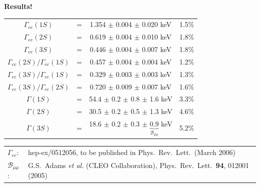 \documentclass[landscape]{article}
\newenvironment{slide}[1][ ]{\mbox{\bf #1 } \vfill}{\vfill \mbox{ } \hfill \Large \arabic{page} \pagebreak}
\newcommand{\subs}[1]{{\mbox{\large #1}}}
\newcommand{\gee}{{\boldmath $\Gamma_{ee}$}}
\newcommand{\bmm}{${\mathcal B}_{\mu\mu}$}
\begin{document}
\begin{slide}[Results!]

\begin{center}
\renewcommand{\arraystretch}{1.8}
\begin{tabular}{c c c c}

  \boldmath $\Gamma_{ee}(1S)$ & \mbox{\hspace{0.25 cm}} = \mbox{\hspace{0.25 cm}} & 1.354 $\pm$ 0.004 $\pm$ 0.020 keV & \mbox{\hspace{0.5 cm}} 1.5\% \mbox{\hspace{0.5 cm}} \\
  \boldmath $\Gamma_{ee}(2S)$ & = & 0.619 $\pm$ 0.004 $\pm$ 0.010 keV & 1.8\% \\
  \boldmath $\Gamma_{ee}(3S)$ & = & 0.446 $\pm$ 0.004 $\pm$ 0.007 keV & 1.8\% \\\hline

  \boldmath $\Gamma_{ee}(2S)/\Gamma_{ee}(1S)$ & = & 0.457 $\pm$ 0.004 $\pm$ 0.004 keV & 1.2\% \\
  \boldmath $\Gamma_{ee}(3S)/\Gamma_{ee}(1S)$ & = & 0.329 $\pm$ 0.003 $\pm$ 0.003 keV & 1.3\% \\
  \boldmath $\Gamma_{ee}(3S)/\Gamma_{ee}(2S)$ & = & 0.720 $\pm$ 0.009 $\pm$ 0.007 keV & 1.6\% \\\hline

  \boldmath $\Gamma(1S)$ & = & 54.4 $\pm$ 0.2 $\pm$ 0.8 $\pm$ 1.6 keV & 3.3\% \\
  \boldmath $\Gamma(2S)$ & = & 30.5 $\pm$ 0.2 $\pm$ 0.5 $\pm$ 1.3 keV & 4.6\% \\
  \boldmath $\Gamma(3S)$ & = & 18.6 $\pm$ 0.2 $\pm$ 0.3 $\pm$ $\underbrace{\mbox{0.9}}_{{\mathcal B}_{\mu\mu}}$ keV & 5.2\% \\

\end{tabular}
\end{center}

\vspace{0.5 cm}
{\Large \hfill \renewcommand{\arraystretch}{1.5} \begin{tabular}{l l}
\gee: & hep-ex/0512056, to be published in Phys.\ Rev.\ Lett.\ (March 2006) \\
\bmm: & G.S.~Adams {\it et al.} (CLEO Collaboration), Phys.\ Rev.\ Lett.\  {\bf 94}, 012001 (2005)
\end{tabular}}

\end{slide}
\end{document}
